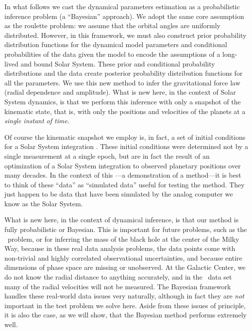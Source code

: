 In what follows we cast the dynamical parameters estimation as a
probabilistic inference problem (a ``Bayesian'' approach). We adopt
the same core assumption as the roulette problem: we assume that the
orbital angles are uniformly distributed. However, in this framework,
we must also construct prior probability distribution functions for
the dynamical model parameters and conditional probabilities of the
data given the model to encode the assumptions of a long-lived and
bound Solar System.  These prior and conditional probability
distributions and the data create posterior probability distribution
functions for all the parameters. We use this new method to infer the
gravitational force law (radial dependence and amplitude).  What is
new here, in the context of Solar System dynamics, is that we perform
this inference with only a snapshot of the kinematic state, that is,
with only the positions and velocities of the planets at a
\emph{single instant of time.}

Of course the kinematic snapshot we employ is, in fact, a set of
initial conditions for a Solar System integration \citep{Giorgini96a}.
These initial conditions were determined not by a single measurement
at a single epoch, but are in fact the result of an optimization of a
Solar System integration to observed planetary positions over many
decades.  In the context of this \chaptername---a demonstration of a
method---it is best to think of these ``data'' as ``simulated data''
useful for testing the method.  They just happen to be data that have
been simulated by the analog computer we know as the Solar System.

What is new here, in the context of dynamical inference, is that our
method is fully probabilistic or Bayesian.  This is important for
future problems, such as the \Gaia\ problem, or for inferring the mass
of the black hole at the center of the Milky Way, because in these
real data analysis problems, the data points come with non-trivial and
highly correlated observational uncertainties, and because entire
dimensions of phase space are missing or unobserved.  At the Galactic
Center, we do not know the radial distance to anything accurately, and
in the \Gaia\ data set many of the radial velocities will not be
measured.  The Bayesian framework handles these real-world data issues
very naturally, although in fact they are \emph{not} important in the
test problem we solve here.  Aside from these issues of principle, it
is also the case, as we will show, that the Bayesian method performs
extremely well.

